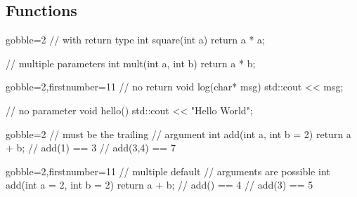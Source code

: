 \subsection[$f()$]{Functions}

\begin{frame}[fragile]
  \begin{multicols}{2}
    \begin{cppcode*}{gobble=2}
      // with return type
      int square(int a) {
        return a * a;
      }

      // multiple parameters
      int mult(int a,
               int b) {
        return a * b;
      }
    \end{cppcode*}
    \columnbreak
    \begin{cppcode*}{gobble=2,firstnumber=11}
      // no return
      void log(char* msg) {
        std::cout << msg;
      }

      // no parameter
      void hello() {
        std::cout << "Hello World";
      }
    \end{cppcode*}
  \end{multicols}
\end{frame}

\begin{frame}[fragile]
  \begin{multicols}{2}
    \begin{cppcode*}{gobble=2}
      // must be the trailing
      // argument
      int add(int a,
              int b = 2) {
        return a + b;
      }
      // add(1) == 3
      // add(3,4) == 7

    \end{cppcode*}
    \columnbreak
    \begin{cppcode*}{gobble=2,firstnumber=11}
      // multiple default
      // arguments are possible
      int add(int a = 2,
              int b = 2) {
        return a + b;
      }
      // add() == 4
      // add(3) == 5
    \end{cppcode*}
  \end{multicols}
\end{frame}


